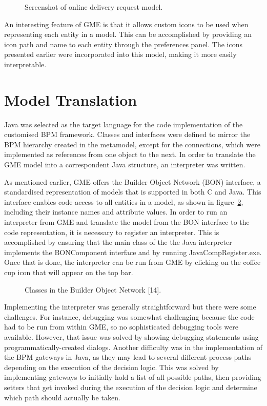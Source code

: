\documentclass[11pt, a4paper, oneside, openright]{article}
\begin{document}
\begin{figure}[!ht]
\centerline{}
\caption{Screenshot of online delivery request model.}
\label{fig:model}
\end{figure}

An interesting feature of GME is that it allows custom icons to be used when
representing each entity in a model. This can be accomplished by providing an
icon path and name to each entity through the preferences panel. The icons
presented earlier were incorporated into this model, making it more easily
interpretable.

\section{Model Translation}
Java was selected as the target language for the code implementation of the
customised BPM framework. Classes and interfaces were defined to mirror the BPM
hierarchy created in the metamodel, except for the connections, which were
implemented as references from one object to the next. In order to translate the
GME model into a correspondent Java structure, an interpreter was written.

As mentioned earlier, GME offers the Builder Object Network (BON) interface, a
standardised representation of models that is supported in both C and Java. This
interface enables code access to all entities in a model, as shown in figure~\ref{fig:bon},
including their instance names and attribute values. In order to run an interpreter
from GME and translate the model from the BON interface to the code
representation, it is necessary to register an interpreter. This is accomplished
by ensuring that the main class of the the Java interpreter implements the
BONComponent interface and by running JavaCompRegister.exe. Once that is done, the
interpreter can be run from GME by clicking on the coffee cup icon that will
appear on the top bar.

\begin{figure}[!ht]
\centerline{}
\caption{Classes in the Builder Object Network [14].}
\label{fig:bon}
\end{figure}

Implementing the interpreter was generally straightforward but there were some
challenges. For instance, debugging was somewhat challenging because the code
had to be run from within GME, so no sophisticated debugging tools were
available. However, that issue was solved by showing debugging statements using
programmatically-created dialogs. Another difficulty was in the implementation
of the BPM gateways in Java, as they may lead to several different process paths
depending on the execution of the decision logic. This was solved by
implementing gateways to initially hold a list of all possible paths, then
providing setters that get invoked during the execution of the decision logic
and determine which path should actually be taken.
\end{document}
